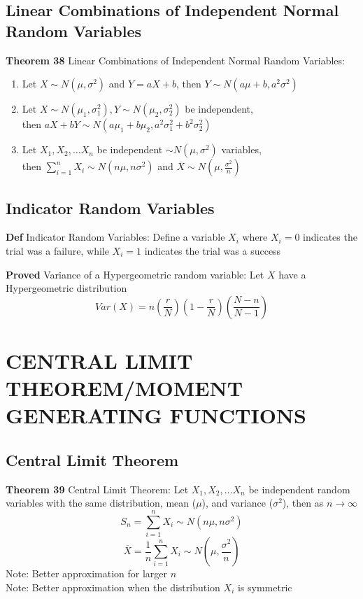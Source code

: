 \documentclass[11pt,notitlepage]{report}
\begin{document}
\section{Linear Combinations of Independent Normal Random Variables}

\textbf{Theorem 38} Linear Combinations of Independent Normal Random Variables: 
\begin{enumerate}
    \item Let $X \sim N(\mu, \sigma^2)$ and $Y = aX + b$, then $Y \sim N(a\mu + b, a^2\sigma^2)$
    \item Let $X \sim N(\mu_1, \sigma_1^2), Y \sim N(\mu_2, \sigma_2^2)$ be independent, \\
    then $aX + bY \sim N(a\mu_1 + b\mu_2, a^2\sigma_1^2 + b^2\sigma_2^2)$
    \item Let $X_1, X_2, \dots X_n$ be independent $\sim N(\mu, \sigma^2)$ variables, \\
    then $\displaystyle \sum_{i=1}^n X_i \sim N(n\mu, n\sigma^2)$ and $\overline X \sim N\left(\mu, \frac{\sigma^2}{n}\right)$
\end{enumerate}

\section{Indicator Random Variables}

\textbf{Def} Indicator Random Variables: Define a variable $X_i$ where $X_i = 0$ indicates the trial was a failure, while $X_i = 1$ indicates the trial was a success


\textbf{Proved} Variance of a Hypergeometric random variable: Let $X$ have a Hypergeometric distribution
$$Var(X) = n\left(\frac{r}{N}\right)\left(1-\frac{r}{N}\right)\left(\frac{N-n}{N-1}\right)$$

\chapter{CENTRAL LIMIT THEOREM/MOMENT GENERATING FUNCTIONS}

\section{Central Limit Theorem}


\textbf{Theorem 39} Central Limit Theorem: Let $X_1, X_2, \dots X_n$ be independent random variables with the same distribution, mean ($\mu$), and variance ($\sigma^2$), then as $n \to \infty$
$$S_n = \sum^n_{i=1} X_i \sim N\left(n\mu, n\sigma^2\right)$$
$$\overline X = \frac{1}{n} \sum^n_{i=1} X_i \sim N\left(\mu, \frac{\sigma^2}{n}\right)$$
\hspace*{5mm} Note: Better approximation for larger $n$\\
\hspace*{5mm} Note: Better approximation when the distribution $X_i$ is symmetric
\end{document}
